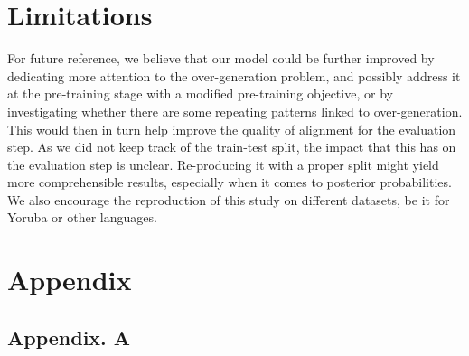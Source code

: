 \documentclass[11pt]{article}
\begin{document}
{\section*{Limitations}

For future reference, we believe that our model could be further improved by dedicating more attention to the over-generation problem, and possibly address it at the pre-training stage with a modified pre-training objective, or by investigating whether there are some repeating patterns linked to over-generation. This would then in turn help improve the quality of alignment for the evaluation step.
As we did not keep track of the train-test split, the impact that this has on the evaluation step is unclear. Re-producing it with a proper split might yield more comprehensible results, especially when it comes to posterior probabilities.
We also encourage the reproduction of this study on different datasets, be it for Yoruba or other languages.




\appendix
\section{Appendix}
\label{sec:appendix}
\subsection{Appendix. A}

}
\end{document}
